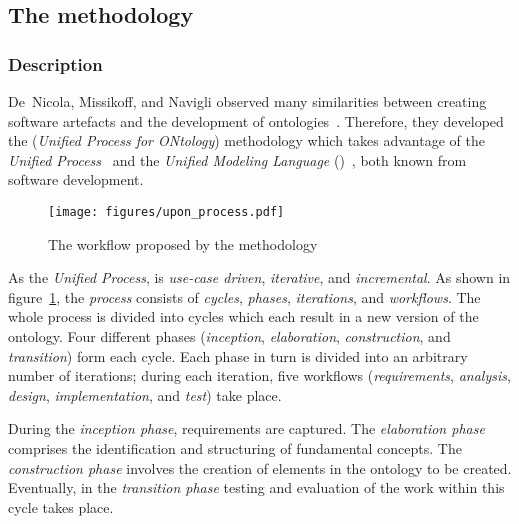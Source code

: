 \subsection{The  methodology}
\label{subsec:approach2}

\subsubsection{Description}

De~Nicola, Missikoff, and Navigli observed many similarities between creating software artefacts and the development of ontologies~\cite{SoftwareEngineeringOntology}. Therefore, they developed the  (\emph{Unified Process for ONtology}) methodology which takes advantage of the \emph{Unified Process}~\cite{UnifiedProcess} and the \emph{Unified Modeling Language} ()~\cite{UML}, both known from software development.

\begin{figure}
\centering
\texttt{[image: figures/upon\_process.pdf]}
\caption{The workflow proposed by the  methodology~\cite{SoftwareEngineeringOntology}}
\label{fig:upon_process}
\end{figure}

As the \emph{Unified Process},  is \emph{use-case driven}, \emph{iterative}, and \emph{incremental}. As shown in figure~\ref{fig:upon_process}, the  \emph{process} consists of \emph{cycles}, \emph{phases}, \emph{iterations}, and \emph{workflows}. The whole process is divided into cycles which each result in a new version of the ontology. Four different phases (\emph{inception}, \emph{elaboration}, \emph{construction}, and \emph{transition}) form each cycle. Each phase in turn is divided into an arbitrary number of iterations; during each iteration, five workflows (\emph{requirements}, \emph{analysis}, \emph{design}, \emph{implementation}, and \emph{test}) take place.

During the \emph{inception phase}, requirements are captured. The \emph{elaboration phase} comprises the identification and structuring of fundamental concepts. The \emph{construction phase} involves the creation of elements in the ontology to be created. Eventually, in the \emph{transition phase} testing and evaluation of the work within this cycle takes place.

